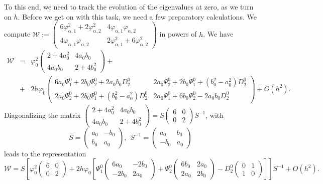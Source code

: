 \documentclass[12pt]{amsart}
\theoremstyle{definition}
\theoremstyle{remark}
\numberwithin{equation}{section}
\newcommand{\W}{{\mathcal W}}
\renewcommand{\(}{\left(}
\renewcommand{\)}{\right)}
\renewcommand{\[}{\left[}
\renewcommand{\]}{\right]}
\newcommand{\al}{\alpha}
\newcommand{\vp}{\varphi}
\begin{document}
 To this end, we need to track the evolution of the eigenvalues at zero, as we turn on $h$. Before we get on with this task, we need a few preparatory calculations. We  compute
 $
 \W:= \left(\begin{array}{cc}
 6\vp_{\al,1}^2+2\vp_{\al,2}^2 & 4 \vp_{\al,1} \vp_{\al,2}    \\
 4 \vp_{\al,1} \vp_{\al,2}  &   2\vp_{\al,1}^2 + 6\vp_{\al,2}^2
 \end{array}
 \right)
 $
 in powers of $h$. We have
 \begin{eqnarray*}
 	\W &=&  \vp_0^2 \left(\begin{array}{cc}
 		2+4 a_0^2 	  &   4 a_0 b_0    \\
 		4 a_0 b_0     &   2+4 b_0^2
 	\end{array}
 	\right)+ \\
 	&+& 2 h \vp_0 \left(\begin{array}{cc}
 		6a_0 \Psi_1^0 + 2 b_0\Psi_2^0  +2 a_0 b_0 D_2^0 &  2 a_0 \Psi_2^0+2 b_0  \Psi_1^0+(b_0^2-a_0^2)D_2^0      \\
 		2 a_0 \Psi_2^0+2 b_0  \Psi_1^0   +(b_0^2-a_0^2)D_2^0     &    	2 a_0 \Psi_1^0 + 6 b_0\Psi_2^0 -2 a_0 b_0 D_2^0
 	\end{array}
 	\right)+O(h^2).
 \end{eqnarray*}
 Diagonalizing the matrix $\left(\begin{array}{cc}
 2+4 a_0^2 	  &   4 a_0 b_0    \\
 4 a_0 b_0     &   2+4 b_0^2
 \end{array}
 \right)=S \left(\begin{array}{cc}
 6  	  &   0 \\
 0    &  2
 \end{array}
 \right) S^{-1} $, with
 $$
 S=\left(\begin{array}{cc}
 a_0 	  &   -b_0 \\
 b_0   &  a_0
 \end{array}
 \right),\ \  S^{-1}=\left(\begin{array}{cc}
 a_0  & b_0  \\
 -b_0 &  a_0
 \end{array}
 \right)
 $$
 leads to the representation
 $$
  	\W =      S \left[\vp_0^2 \left(\begin{array}{cc}
 		6  	  &   0 \\
 		0    &  2
 	\end{array}
 	\right)+ 2 h \vp_0 [\Psi_1^0  \left(\begin{array}{cc}
 		6a_0	& -2b_0 \\
 		-2b_0  & 2 a_0
 	\end{array}
 	\right) +\Psi_2^0   \left(\begin{array}{cc}
 		6 b_0 &  2 a_0   \\
 		2a_0   & 2b_0
 	\end{array}
 	\right)-D_2^0\left( \begin{array}{cc}
 		0 & 1 \\
 		1 & 0
 	\end{array} \right)] \right]S^{-1}+O(h^2).
$$
\end{document}
